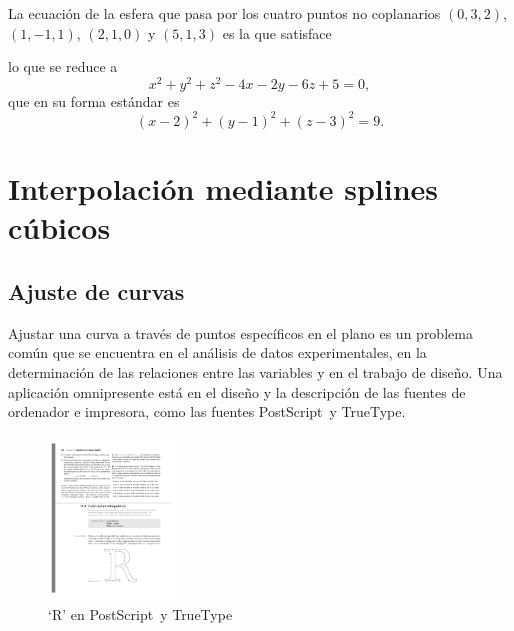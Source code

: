 \begin{examplebox}{}{}
    La ecuación de la esfera que pasa por los cuatro puntos no coplanarios $(0, 3, 2)$, $(1, -1, 1)$, $(2, 1, 0)$ y $(5, 1, 3)$ es la que satisface
    \begin{matrizn}
    \end{matrizn}
    lo que se reduce a
    $$x^2 + y^2 + z^2 - 4x - 2y - 6z + 5 = 0,$$
    que en su forma estándar es
    $$(x - 2)^2 + (y - 1)^2 + (z - 3)^2 = 9.$$
\end{examplebox}

\newpage

\section{Interpolación mediante splines cúbicos}

\subsection*{Ajuste de curvas}

Ajustar una curva a través de puntos específicos en el plano es un problema común que se encuentra en el análisis de datos experimentales, en la determinación de las relaciones entre las variables y en el trabajo de diseño. Una aplicación omnipresente está en el diseño y la descripción de las fuentes de ordenador e impresora, como las fuentes PostScript\texttrademark ~y TrueType\texttrademark.
\begin{figure}[h!]
    \centering
    \includegraphics[width=0.3\textwidth]{Images/Capitulo8/R.pdf}
    \caption{‘R’ en PostScript\texttrademark ~y TrueType\texttrademark}
\end{figure}

